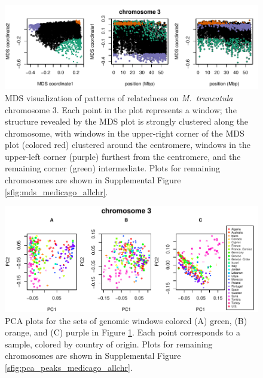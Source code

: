 \documentclass[11pt, oneside]{article}   	%
\begin{document}
\begin{figure}
    \begin{center}
       \includegraphics{Fig6_Together_MDS_plot_chr3_final}
    \end{center}
    \caption{
       MDS visualization of patterns of relatedness on \textit{M.~truncatula} chromosome 3. 
       Each point in the plot represents a window;
       the structure revealed by the MDS plot is strongly clustered along the chromosome,
       with windows in the upper-right corner of the MDS plot (colored red) clustered around the centromere,
       windows in the upper-left corner (purple) furthest from the centromere,
       and the remaining corner (green) intermediate.
       Plots for remaining chromosomes are shown in Supplemental Figure \ref{sfig:mds_medicago_allchr}.
       \label{fig:mds12_medicago}
    }
\end{figure}

\begin{figure}
    \begin{center}
       \includegraphics{Fig7_pca_plots_for_Medicago_chr3_3peaks_byMDS}
    \end{center}
    \caption{
        PCA plots for the sets of genomic windows colored (A) green, (B) orange, and (C) purple in Figure \ref{fig:mds12_medicago}. 
        Each point corresponds to a sample, colored by country of origin.
        Plots for remaining chromosomes are shown in Supplemental Figure \ref{sfig:pca_peaks_medicago_allchr}.
        \label{fig:pca_medicago}
    }
\end{figure}
\end{document}
